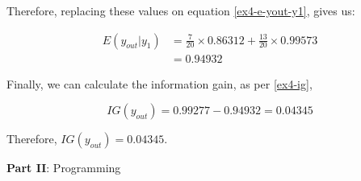 \documentclass[12pt]{article}
\begin{document}
\begin{enumerate}[leftmargin=\labelsep]
          Therefore, replacing these values on equation \eqref{ex4-e-yout-y1}, gives us:

          \[
              \begin{aligned}
                  E(y_{out} | y_1) & = \frac{7}{20} \times 0.86312 + \frac{13}{20} \times 0.99573 \\
                                   & = 0.94932
              \end{aligned}
          \]

          Finally, we can calculate the information gain, as per \eqref{ex4-ig},

          \[
              IG(y_{out}) = 0.99277 - 0.94932 = 0.04345
          \]

          Therefore, \(IG(y_{out}) = 0.04345\).
\end{enumerate}

\center\large{\textbf{Part II}: Programming}
\end{document}
